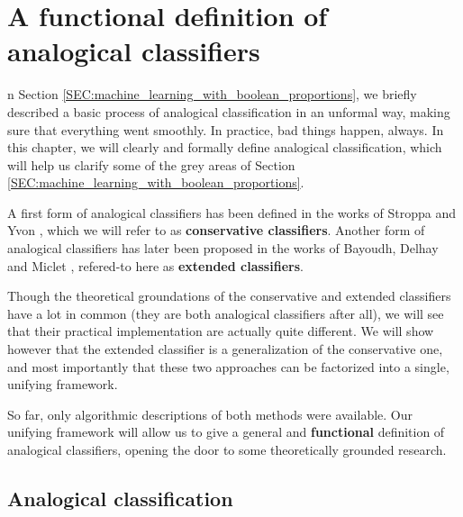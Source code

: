 \chapter{A functional definition of analogical classifiers}
\label{CHAP:functional_definition}

n Section \ref{SEC:machine_learning_with_boolean_proportions}, we briefly
described a basic process of analogical classification in an unformal way,
making sure that everything went smoothly. In practice, bad things happen,
always. In this chapter, we will clearly and formally define analogical
classification, which will help us clarify some of the grey areas of Section
\ref{SEC:machine_learning_with_boolean_proportions}.

A first form of analogical classifiers has been defined in the works of Stroppa
and Yvon \cite{StrYvoCNLL05}, which we will refer to as \textbf{conservative
classifiers}. Another form of analogical classifiers has later been proposed in
the works of Bayoudh, Delhay and Miclet \cite{MicBayDelJAIR08,
BayMicDelIJCAI07}, refered-to here as \textbf{extended classifiers}.

Though the theoretical groundations of the conservative and extended
classifiers have a lot in common (they are both analogical classifiers after
all), we will see that their practical implementation are actually quite
different. We will show however that the extended classifier is a
generalization of the conservative one, and most importantly that these two
approaches can be factorized into a single, unifying framework.

So far, only algorithmic descriptions of both methods were available. Our
unifying framework will allow us to give a general and \textbf{functional}
definition of analogical classifiers, opening the door to some theoretically
grounded research.

\section{Analogical classification}

